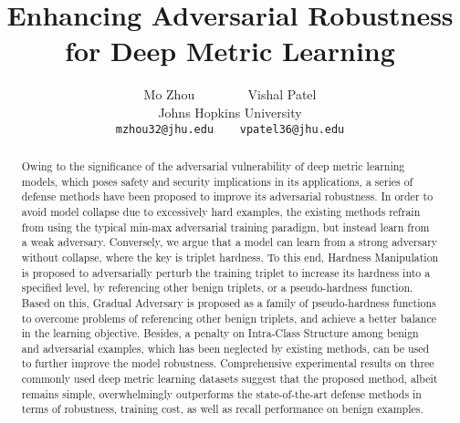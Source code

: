 \documentclass[10pt,twocolumn,letterpaper]{article}
\begin{document}
\title{Enhancing Adversarial Robustness for Deep Metric Learning}

\author{Mo Zhou ~~~~~~~ Vishal Patel\\
Johns Hopkins University\\
{\tt\small mzhou32@jhu.edu ~~ vpatel36@jhu.edu}
}
\maketitle

\begin{abstract}
	Owing to the significance of the adversarial vulnerability of deep metric
	learning models, which poses safety and security implications in its
	applications, a series of defense methods have been proposed to improve its
	adversarial robustness.
	In order to avoid model collapse due to excessively hard examples, the
	existing methods refrain from using the typical min-max adversarial
	training paradigm, but instead learn from a weak adversary.
	Conversely, we argue that a model can learn from a strong adversary without
	collapse, where the key is triplet hardness.
	To this end, Hardness Manipulation is proposed to adversarially perturb the
	training triplet to increase its hardness into a specified level, by
	referencing other benign triplets, or a pseudo-hardness function.
	Based on this, Gradual Adversary is proposed as a family of pseudo-hardness
	functions to overcome problems of referencing other benign triplets, and
	achieve a better balance in the learning objective.
	Besides, a penalty on Intra-Class Structure among benign and adversarial
	examples, which has been neglected by existing methods, can be used to
	further improve the model robustness.
	Comprehensive experimental results on three commonly used deep metric
	learning datasets suggest that the proposed method, albeit remains
	simple, overwhelmingly outperforms the state-of-the-art defense
	methods in terms of robustness, training cost, as well as recall
	performance on benign examples.
%
\end{abstract}
\end{document}
